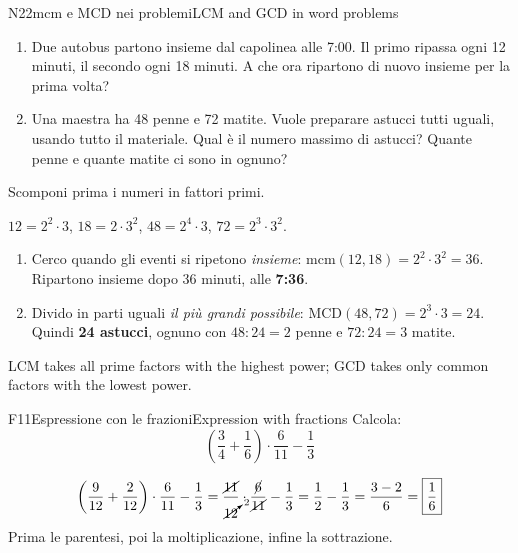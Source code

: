 \begin{esercizio}{N2}{2}{mcm e MCD nei problemi}{LCM and GCD in word problems}
\begin{enumerate}
\item Due autobus partono insieme dal capolinea alle 7:00. Il primo ripassa ogni 12 minuti, il secondo ogni 18 minuti. A che ora ripartono di nuovo insieme per la prima volta?
\item Una maestra ha 48 penne e 72 matite. Vuole preparare astucci tutti uguali, usando tutto il materiale. Qual è il numero massimo di astucci? Quante penne e quante matite ci sono in ognuno?
\end{enumerate}
Scomponi prima i numeri in fattori primi. 
\end{esercizio}
\begin{solbox}
$12=2^2\cdot3$, \quad $18=2\cdot3^2$, \quad $48=2^4\cdot3$, \quad $72=2^3\cdot3^2$.
\begin{enumerate}
\item Cerco quando gli eventi si ripetono \emph{insieme}: $\text{mcm}(12,18)=2^2\cdot3^2=36$. Ripartono insieme dopo 36 minuti, alle \textbf{7:36}.
\item Divido in parti uguali \emph{il più grandi possibile}: $\text{MCD}(48,72)=2^3\cdot3=24$. Quindi \textbf{24 astucci}, ognuno con $48:24=2$ penne e $72:24=3$ matite.
\end{enumerate}
{LCM takes all prime factors with the highest power; GCD takes only common factors with the lowest power.}
\end{solbox}


\begin{esercizio}{F1}{1}{Espressione con le frazioni}{Expression with fractions}
Calcola: 
\[\left(\frac34+\frac16\right)\cdot\frac{6}{11}-\frac13\]
\end{esercizio}
\begin{solbox}
\[
\left(\frac{9}{12}+\frac{2}{12}\right)\cdot\frac{6}{11}-\frac13
=\frac{\cancel{11}}{\cancelto{2}{12}}\cdot\frac{\cancel{6}}{\cancel{11}}-\frac13
=\frac12-\frac13=\frac{3-2}{6}=\boxed{\frac16}
\]
Prima le parentesi, poi la moltiplicazione, infine la sottrazione.
\end{solbox}


